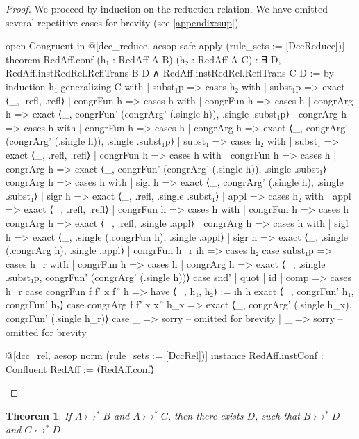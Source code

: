 \documentclass{article}
\newtheorem{theorem}{Theorem}
\newcommand{\affarr}{\rightarrowtail}
\begin{document}
\begin{proof}
  We proceed by induction on the reduction relation. We have omitted several repetitive cases for brevity (see \eqref{appendix:sup}).

\begin{leancode}
open Congruent in @[dcc_reduce, aesop safe apply (rule_sets := [DccReduce])] theorem RedAff.conf (h₁ : RedAff A B) (h₂ : RedAff A C) : ∃ D, RedAff.instRedRel.ReflTrans B D ∧ RedAff.instRedRel.ReflTrans C D := by
  induction h₁ generalizing C with
  | subst₁p =>
    cases h₂ with
    | subst₁p => exact ⟨_, .refl, .refl⟩
    | congrFun h => cases h with
      | congrFun h => cases h
      | congrArg h => exact ⟨_, congrFun' (congrArg' (.single h)), .single .subst₁p⟩
    | congrArg h => cases h with
      | congrFun h => cases h
      | congrArg h => exact ⟨_, congrArg' (congrArg' (.single h)), .single .subst₁p⟩
  | subst₁ =>
    cases h₂ with
    | subst₁ => exact ⟨_, .refl, .refl⟩
    | congrFun h => cases h with
      | congrFun h => cases h
      | congrArg h => exact ⟨_, congrFun' (congrArg' (.single h)), .single .subst₁⟩
    | congrArg h => cases h with
      | sigl h => exact ⟨_, congrArg' (.single h), .single .subst₁⟩
      | sigr h => exact ⟨_, .refl, .single .subst₁⟩
  | appl =>
    cases h₂ with
    | appl => exact ⟨_, .refl, .refl⟩
    | congrFun h => cases h with
      | congrFun h => cases h
      | congrArg h => exact ⟨_, .refl, .single .appl⟩
    | congrArg h =>
      cases h with
      | sigl h => exact ⟨_, .single (.congrFun h), .single .appl⟩
      | sigr h => exact ⟨_, .single (.congrArg h), .single .appl⟩
  | congrFun h_r ih =>
    cases h₂
    case subst₁p =>
      cases h_r with
      | congrFun h => cases h
      | congrArg h => exact ⟨_, .single .subst₁p, congrFun' (congrArg' (.single h))⟩
    case snd' | quot | id | comp => cases h_r
    case congrFun f f' x f'' h =>
      have ⟨_, h₁, h₂⟩ := ih h
      exact ⟨_, congrFun' h₁, congrFun' h₂⟩
    case congrArg f f' x x'' h_x =>
      exact ⟨_, congrArg' (.single h_x), congrFun' (.single h_r)⟩
    case _ => sorry -- omitted for brevity
  | _ => sorry -- omitted for brevity

@[dcc_rel, aesop norm (rule_sets := [DccRel])] instance RedAff.instConf : Confluent RedAff := ⟨RedAff.conf⟩
\end{leancode}
\end{proof}

\begin{theorem}
  If \(A \affarr^{*} B\) and \(A \affarr^{*} C\), then there exists \(D\), such that \(B \affarr^{*} D\) and \(C \affarr^{*} D\).
\end{theorem}
\end{document}
